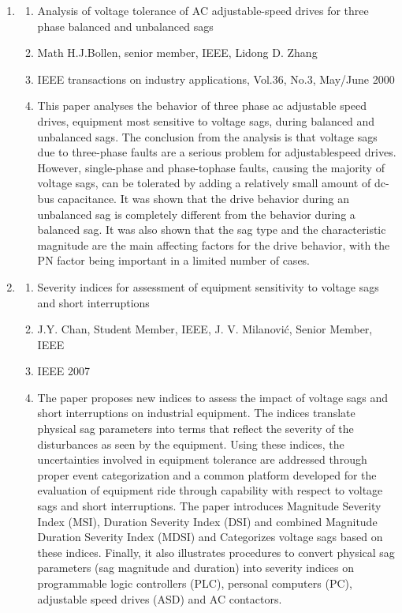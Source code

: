 \documentclass[14pt, a4paper]{extreport}
\begin{document}
\begin{enumerate}
     \item
    \begin{enumerate}
    \item{}Analysis of
voltage
tolerance of AC
adjustable-speed
drives for three
phase balanced
and unbalanced
sags
\item{}Math
H.J.Bollen,
senior member,
IEEE,
Lidong D.
Zhang
\item{}IEEE
transactions
on industry
applications,
Vol.36, No.3,
May/June
2000
\item{}This paper analyses the
behavior of three phase ac
adjustable speed drives,
equipment most sensitive
to voltage sags, during
balanced and unbalanced
sags. The conclusion from
the analysis is that voltage
sags due to three-phase
faults are a serious
problem for adjustablespeed
drives. However,
single-phase and phase-tophase
faults, causing the
majority of voltage sags,
can be tolerated by adding
a relatively small amount
of dc-bus capacitance. It
was shown that the drive
behavior during an
unbalanced sag is
completely different from
the behavior during a
balanced sag. It was also shown that the sag type
and the characteristic
magnitude are the main
affecting factors for the
drive behavior, with the
PN factor being important
in a limited number of 
cases.

    \end{enumerate}
     \item
    \begin{enumerate}
    \item{}Severity indices
for assessment
of equipment
sensitivity to
voltage sags and
short
interruptions

 \item{}J.Y. Chan,
Student
Member, IEEE,
J. V. Milanović,
Senior Member,
IEEE
\item{}IEEE 2007
\item{}The paper proposes new
indices to assess the
impact of voltage sags
and short interruptions on
industrial equipment. The
indices translate physical
sag parameters into terms
that reflect the severity of
the disturbances as seen
by the equipment. Using
these indices, the
uncertainties involved in
equipment tolerance are
addressed through proper
event categorization and a
common platform
developed for the
evaluation of equipment
ride through capability
with respect to voltage
sags and short
interruptions. The paper
introduces Magnitude
Severity Index (MSI),
Duration Severity Index
(DSI) and combined
Magnitude Duration
Severity Index (MDSI)
and Categorizes voltage
sags based on these
indices. Finally, it also
illustrates procedures to
convert physical sag
parameters (sag
magnitude and duration)
into severity indices on
programmable logic controllers (PLC),
personal computers (PC),
adjustable speed drives
(ASD) and AC contactors. 
    \end{enumerate}
         \end{enumerate}
         
\end{document}
